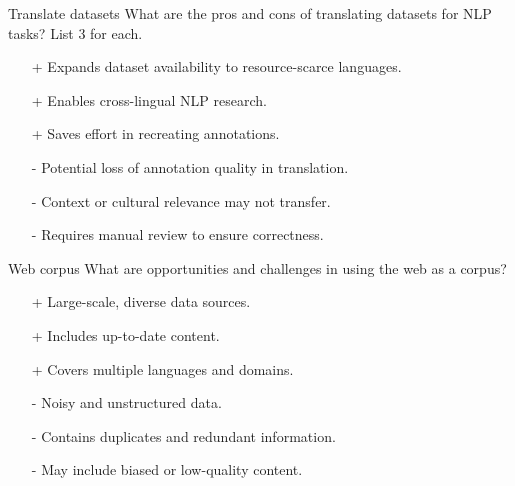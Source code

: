 \documentclass{article}
\begin{document}
\begin{exercise}{Translate datasets}
  What are the pros and cons of translating datasets for NLP tasks? List 3 for each.

  \begin{solution}
    \begin{itemize}
        \item[+] Expands dataset availability to resource-scarce languages.
        \item[+] Enables cross-lingual NLP research.
        \item[+] Saves effort in recreating annotations.
        \item[-] Potential loss of annotation quality in translation.
        \item[-] Context or cultural relevance may not transfer.
        \item[-] Requires manual review to ensure correctness.
    \end{itemize}
  \end{solution}
\end{exercise}

\begin{exercise}{Web corpus}
  What are opportunities and challenges in using the web as a corpus?

  \begin{solution}
    \begin{itemize}
        \item[+] Large-scale, diverse data sources.
        \item[+] Includes up-to-date content.
        \item[+] Covers multiple languages and domains.
        \item[-] Noisy and unstructured data.
        \item[-] Contains duplicates and redundant information.
        \item[-] May include biased or low-quality content.
    \end{itemize}
  \end{solution}
\end{exercise}
\end{document}
